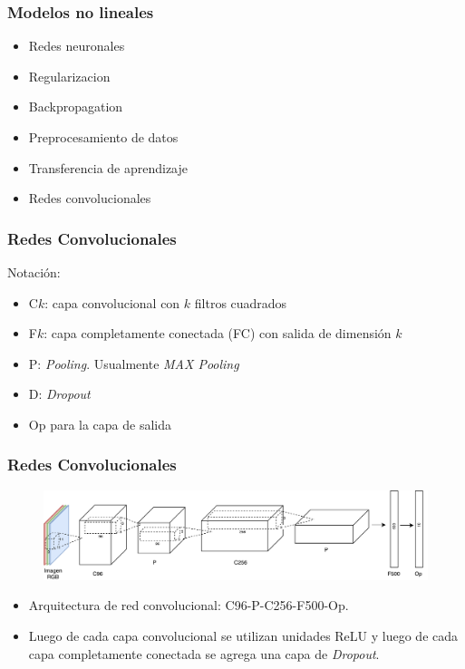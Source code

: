 \documentclass{beamer}
\begin{document}
\begin{frame}
\frametitle{Modelos no lineales}
\begin{itemize}
    \item Redes neuronales
    \item Regularizacion
    \item Backpropagation
    \item Preprocesamiento de datos
    \item Transferencia de aprendizaje
    \item Redes convolucionales
\end{itemize}
\end{frame}





\begin{frame}
\frametitle{Redes Convolucionales}
Notación:
\begin{itemize}
    \item C\(k\): capa convolucional con \(k\) filtros cuadrados
    \item F\(k\): capa completamente conectada (FC) con salida de dimensión \(k\)
    \item P: \textit{Pooling}. Usualmente \textit{MAX Pooling}
    \item D: \textit{Dropout}
    \item Op para la capa de salida
\end{itemize}
\end{frame}





\begin{frame}
\frametitle{Redes Convolucionales}
\begin{figure}
    \centering
    \includegraphics[width=\textwidth]{images/net_example.pdf}
\end{figure}
\begin{itemize}
    \item Arquitectura de red convolucional: C96-P-C256-F500-Op.
    \item Luego de cada capa convolucional se utilizan unidades ReLU y luego de cada capa completamente conectada se agrega una capa de \textit{Dropout}.
\end{itemize}
\end{frame}
\end{document}
